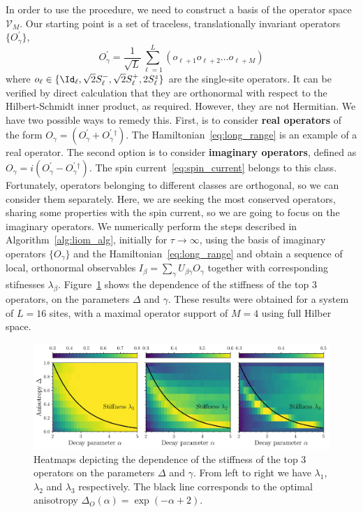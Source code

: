 In order to use the procedure, we need to construct a basis of the operator space \(\mathcal{V}_M\).
Our starting point is a set of traceless, translationally invariant operators \(\{O^{\prime}_{\gamma}\}\),
\begin{equation}
  O^{\prime}_{\gamma} = \frac{1}{\sqrt{L}}\sum_{\ell=1}^L\left( o_{\ell+1}o_{\ell+2}\ldots o_{\ell+M} \right)
  \label{eq:operator_basis}
\end{equation}
where \(o_{\ell} \in \{\Id_{\ell}, \sqrt{2}\Sm_{\ell},\sqrt{2}\Sp_{\ell},2\Sz_{\ell}\}\) are the single-site operators.
It can be verified by direct calculation that they are orthonormal with respect to the Hilbert-Schmidt inner product,
as required. However, they are not Hermitian. We have two possible ways to remedy this. First, is
to consider \textbf{real operators} of the form \(O_{\gamma} = (O^{\prime}_{\gamma} + O^{\prime}_{\gamma}{}^{\dag})\).
The Hamiltonian~\eqref{eq:long_range} is an example of a real operator. The second option is to consider \textbf{imaginary operators},
defined as \(O_{\gamma} = i(O^{\prime}_{\gamma} - O^{\prime}_{\gamma}{}^{\dag})\). The spin current~\eqref{eq:spin_current}
belongs to this class. Fortunately, operators belonging to different classes are orthogonal, so we can
consider them separately. Here, we are seeking the most conserved operators, sharing some properties with
the spin current, so we are going to focus on the imaginary operators. We numerically perform the steps
described in Algorithm~\ref{alg:liom_alg}, initially for \(\tau\to\infty\), using the basis of imaginary operators \(\{O_{\gamma}\}\)
and the Hamiltonian~\eqref{eq:long_range} and obtain a sequence of local, orthonormal observables
\(I_{\beta} = \sum_{\gamma} U_{\beta\gamma} O_{\gamma}\) together with corresponding stifnesses \(\lambda_{\beta}\).
Figure~\ref{fig:stiffness} shows the dependence of the stiffness of the top 3 operators, on the parameters \(\Delta\) and \(\gamma\).
These results were obtained for a system of \(L=16\) sites, with a maximal operator support of \(M=4\) using full Hilber space.

\begin{figure}[htbp]
  \centering
  \includegraphics[width=\linewidth]{Figures/stiffness.jpg}
  \caption{Heatmaps depicting the dependence of the stiffness of the top 3 operators on the parameters \(\Delta\) and \(\gamma\).
  From left to right we have \(\lambda_1\), \(\lambda_2\) and \(\lambda_3\) respectively. The black line corresponds
  to the optimal anisotropy \(\Delta_{O}(\alpha) = \exp(-\alpha + 2)\).}
  \label{fig:stiffness}
\end{figure}

